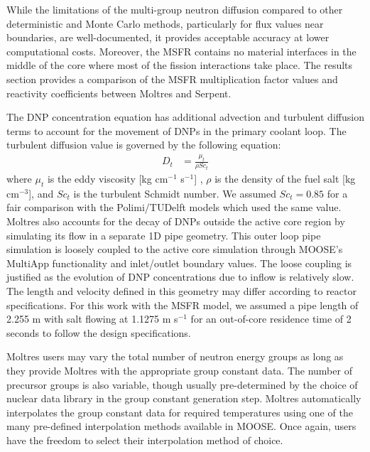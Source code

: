 While the limitations of the multi-group neutron diffusion compared to other
deterministic and Monte Carlo methods, particularly for flux values near
boundaries, are well-documented, it provides acceptable
accuracy at lower computational costs. Moreover, the
\gls{MSFR} contains no material interfaces in the middle of the core where
most of the fission interactions take place. The results section provides a
comparison of the \gls{MSFR} multiplication factor values and reactivity
coefficients between Moltres and Serpent.

The \gls{DNP} concentration equation has additional advection and turbulent
diffusion terms to account for the movement of \glspl{DNP} in the primary
coolant loop. The turbulent diffusion value is governed by the following
equation:
%
\begin{align}
    D_t &= \frac{\mu_t}{\rho Sc_t}
\end{align}
%
where $\mu_t$ is the eddy viscosity [kg cm$^{-1}$ s$^{-1}$] , $\rho$ is the
density of the fuel salt [kg cm$^{-3}$], and $Sc_t$ is the turbulent Schmidt
number. We assumed $Sc_t = 0.85$ for a fair comparison with the Polimi/TUDelft
models which used the same value. Moltres also accounts for the decay of
\glspl{DNP} outside the active core region by simulating its flow in a
separate 1D pipe geometry. This outer loop pipe simulation is loosely coupled
to the active core simulation through MOOSE's MultiApp functionality and
inlet/outlet boundary values. The loose coupling is justified as the evolution
of \gls{DNP} concentrations due to inflow is relatively slow. The length and
velocity defined in this geometry may differ according to reactor
specifications. For this work with the \gls{MSFR} model, we assumed a pipe
length of 2.255 m with salt flowing at 1.1275 m s$^{-1}$ for an out-of-core
residence time of 2 seconds to follow the design specifications.

Moltres users may vary the total number of neutron energy groups as
long as they provide Moltres with the appropriate group constant data. The
number of precursor groups is also variable, though usually pre-determined by
the choice of nuclear data library in the group constant generation step.
Moltres automatically interpolates the group constant data for required
temperatures using one of the many pre-defined interpolation methods available
in \gls{MOOSE}. Once again, users have the freedom to select their
interpolation method of choice.

